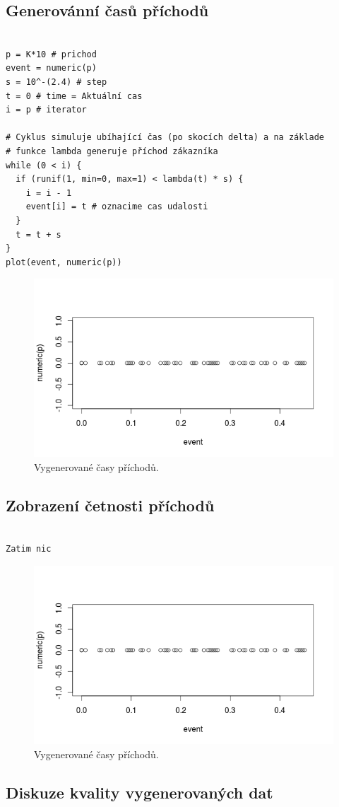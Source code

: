 \documentclass[12pt]{article}
\begin{document}
\subsection{Generovánní časů příchodů}
 \begin{lstlisting}[frame=single]  % Start your code-block
  
p = K*10 # prichod
event = numeric(p)
s = 10^-(2.4) # step
t = 0 # time = Aktuální cas
i = p # iterator

# Cyklus simuluje ubíhající čas (po skocích delta) a na základe
# funkce lambda generuje příchod zákazníka
while (0 < i) {
  if (runif(1, min=0, max=1) < lambda(t) * s) {
    i = i - 1
    event[i] = t # oznacime cas udalosti
  }
  t = t + s
} 
plot(event, numeric(p))
\end{lstlisting}
\begin{figure}[ht!]
	\includegraphics[scale=0.5]{img/2_2_casy_prichodu}\centering
	\caption{Vygenerované časy příchodů.}
	\label{obr:sikme}
\end{figure}

\subsection{Zobrazení četnosti příchodů}
 \begin{lstlisting}[frame=single]  % Start your code-block
  
Zatim nic
\end{lstlisting}
\begin{figure}[ht!]
	\includegraphics[scale=0.5]{img/2_2_casy_prichodu}\centering
	\caption{Vygenerované časy příchodů.}
	\label{obr:sikme}
\end{figure}
\subsection{Diskuze kvality vygenerovaných dat}
\end{document}
